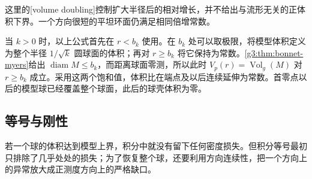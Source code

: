 这里的[volume doubling]控制扩大半径后的相对增长，并不给出与流形无关的正体积下界。一个方向很短的平坦环面仍满足相同倍增常数。

\ProseParagraphBreak

当 \(k>0\) 时，以上公式首先在 \(r<b_k\) 使用。在 \(b_k\) 处可以取极限，将模型体积定义为整个半径 \(1/\sqrt{k}\) 圆球面的体积；再对 \(r\ge b_k\) 将它保持为常数。\cref{g3:thm:bonnet-myers}给出 \(\operatorname{diam}M\le b_k\)，而距离球面零测，所以此时 \(V_p(r)=\operatorname{Vol}_g(M)\) 对 \(r\ge b_k\) 成立。采用这两个饱和值，体积比在端点及以后连续延伸为常数。首零点以后的模型球已经覆盖整个球面，此后的球壳体积为零。

\subsection{等号与刚性}
\label{g3:subsec:0802:04}

若一个球的体积达到模型上界，积分中就没有留下任何密度损失。但积分等号最初只排除了几乎处处的损失；为了恢复整个球，还要利用方向连续性，把一个方向上的异常放大成正测度方向上的严格缺口。

